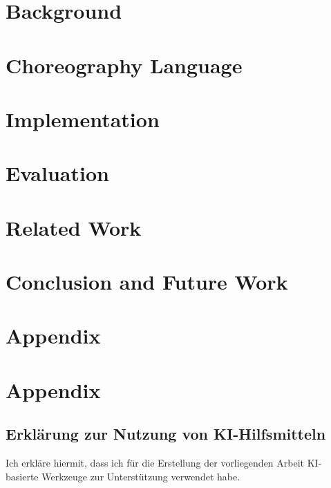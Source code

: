 \documentclass[
	ngerman,
	ruledheaders=section,%
	class=report,%
	thesis={type=master},%
	accentcolor=1d,%
	custommargins=true,%
	marginpar=false,%
	parskip=half-,%
	fontsize=11pt,%
]{tudapub}
\begin{document}
\chapter{Background}
\label{ch:background}



\chapter{Choreography Language}
\label{ch:choreography_language}


\chapter{Implementation}
\label{ch:implementaion}


\chapter{Evaluation}
\label{ch:evaluation}


\chapter{Related Work}
\label{ch:related}


\chapter{Conclusion and Future Work}
\label{ch:conclusion}


\printbibliography[heading=bibintoc]

\appendix
\chapter{Appendix}
\label{app:appendix}


\chapter{Appendix}
\vspace{2cm}
\section*{Erklärung zur Nutzung von KI-Hilfsmitteln}

Ich erkläre hiermit, dass ich für die Erstellung der vorliegenden Arbeit KI-basierte Werkzeuge zur Unterstützung verwendet habe. 
\end{document}
